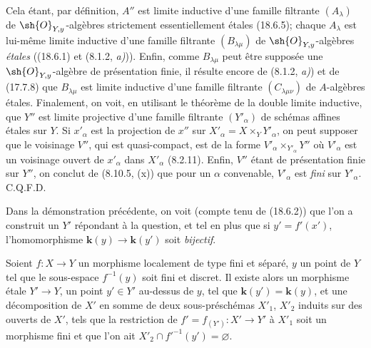 Cela étant, par définition, $A''$ est limite inductive d'une famille filtrante $(A_\lambda)$ de $\sh{O}_{Y,y}$-algèbres strictement essentiellement étales (18.6.5); chaque $A_\lambda$ est lui-même limite inductive d'une famille filtrante $(B_{\lambda\mu})$ de $\sh{O}_{Y,y}$-algèbres \emph{étales} ((18.6.1) et (8.1.2, \emph{a)})). Enfin, comme $B_{\lambda\mu}$ peut être supposée une $\sh{O}_{Y,y}$-algèbre de présentation finie, il résulte encore de (8.1.2, \emph{a)}) et de (17.7.8) que $B_{\lambda\mu}$ est limite inductive d'une famille filtrante $(C_{\lambda\mu\nu})$ de $A$-algèbres étales. Finalement, on voit, en utilisant le théorème de la double limite inductive, que $Y''$ est limite projective d'une famille filtrante $(Y'_\alpha)$ de schémas affines étales sur $Y$. Si $x'_\alpha$ est la projection de $x''$ sur $X'_\alpha=X\times_Y Y'_\alpha$, on peut supposer que le voisinage $V''$, qui est quasi-compact, est de la forme $V'_\alpha\times_{Y'_\alpha}Y''$ où $V'_\alpha$ est un voisinage ouvert de $x'_\alpha$ dans $X'_\alpha$ (8.2.11). Enfin, $V''$ étant de présentation finie sur $Y''$, on conclut de (8.10.5, (x)) que pour un $\alpha$ convenable, $V'_\alpha$ est \emph{fini} sur $Y'_\alpha$. C.Q.F.D.

\begin{remark}[18.12.2]
\label{IV.18.12.2}
Dans la démonstration précédente, on voit (compte tenu de (18.6.2)) que l'on a construit un $Y'$ répondant à la question, et tel en plus que si $y'=f'(x')$, l'homomorphisme $\boldsymbol{k}(y)\to\boldsymbol{k}(y')$ soit \emph{bijectif}.
\end{remark}

\begin{corollary}[18.12.3]
\label{IV.18.12.3}
Soient $f:X\to Y$ un morphisme localement de type fini et séparé, $y$ un point de $Y$ tel que le sous-espace $f^{-1}(y)$ soit fini et discret. Il existe alors un morphisme étale $Y'\to Y$, un point $y'\in Y'$ au-dessus de $y$, tel que $\boldsymbol{k}(y')=\boldsymbol{k}(y)$, et une décomposition de $X'$ en somme de deux sous-préschémas $X'_1$, $X'_2$ induits sur des ouverts de $X'$, tels que la restriction de $f'=f_{(Y')}:X'\to Y'$ à $X'_1$ soit un morphisme fini et que l'on ait $X'_2\cap f'^{-1}(y')=\varnothing$.
\end{corollary}

